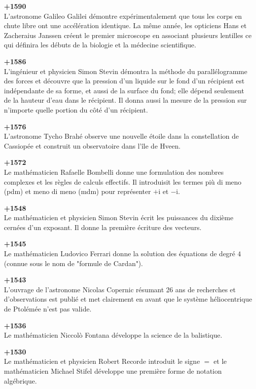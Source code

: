 \textbf{+1590}\\
L'astronome Galileo Galilei démontre expérimentalement que tous les corps en chute libre ont une accélération identique. La même année, les opticiens Hans et Zacheraius Janssen créent le premier microscope en associant plusieurs lentilles ce qui définira les débuts de la biologie et la médecine scientifique.

\textbf{+1586}\\
L'ingénieur et physicien Simon Stevin démontra la méthode du parallélogramme des forces et découvre que la pression d'un liquide sur le fond d'un récipient est indépendante de sa forme, et aussi de la surface du fond; elle dépend seulement de la hauteur d'eau dans le récipient. Il donna aussi la mesure de la pression sur n'importe quelle portion du côté d’un récipient.

\textbf{+1576}\\
L'astronome Tycho Brahé observe une nouvelle étoile dans la constellation de Cassiopée et construit un observatoire dans l'île de Hveen.

\textbf{+1572}\\
Le mathématicien Rafaelle Bombelli donne une formulation des nombres complexes et les règles de calculs effectifs.  Il introduisit les termes più di meno (pdm) et meno di meno (mdm) pour représenter $+\mathrm{i}$ et $-\mathrm{i}$.

\textbf{+1548}\\
Le mathématicien et physicien Simon Stevin écrit les puissances du dixième cernées d'un exposant. Il donne la première écriture des vecteurs. 

\textbf{+1545}\\
Le mathématicien Ludovico Ferrari donne la solution des équations de degré $4$ (connue sous le nom de "formule de Cardan").

\textbf{+1543}\\
L'ouvrage de l'astronome Nicolas Copernic résumant 26 ans de recherches et d'observations est publié et met clairement en avant que le système héliocentrique de Ptolémée n'est pas valide.

\textbf{+1536}\\
Le mathématicien Niccolò Fontana développe la science de la balistique.

\textbf{+1530}\\
Le mathématicien et physicien Robert Recorde introduit le signe $=$ et le mathématicien Michael Stifel développe une première forme de notation algébrique.

